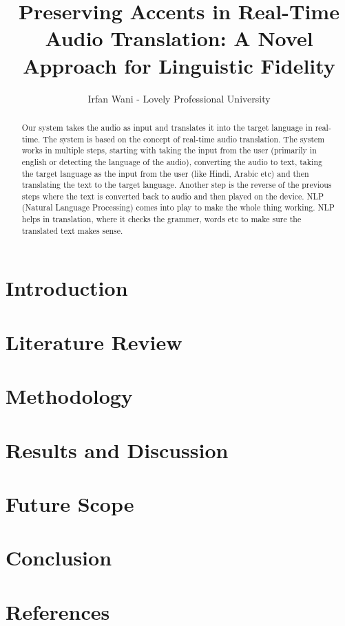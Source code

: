 \documentclass[12pt, a4paper]{article}
\title{Preserving Accents in Real-Time Audio Translation: A Novel Approach for Linguistic Fidelity}
\author{Irfan Wani - Lovely Professional University}
\begin{document}
    
\maketitle
    \begin{abstract}
    Our system takes the audio as input and translates it into the target language in real-time. The system is based on the concept of real-time audio translation. The system works in multiple steps, starting with taking the input from the user (primarily in english or detecting the language of the audio), converting the audio to text, taking the target language as the input from the user (like Hindi, Arabic etc) and then translating the text to the target language. Another step is the reverse of the previous steps where the text is converted back to audio and then played on the device.  NLP (Natural Language Processing) comes into play to make the whole thing working. NLP helps in translation, where it checks the grammer, words etc to make sure the translated text makes sense.
    \end{abstract}

\section{Introduction}
\section{Literature Review}
\section{Methodology}
\section{Results and Discussion}
\section{Future Scope}
\section{Conclusion}
\section{References}
\end{document}
